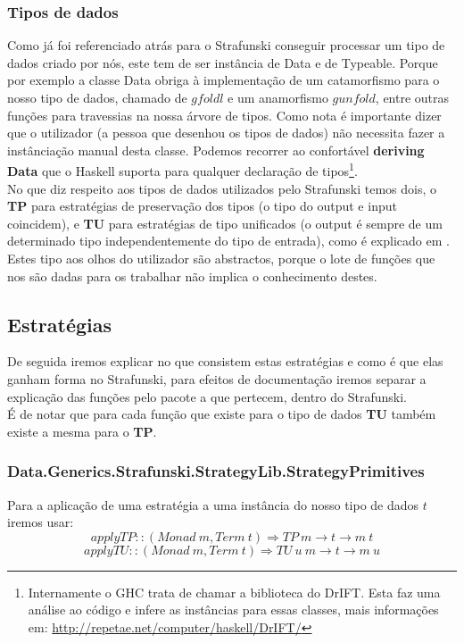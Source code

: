\subsubsection{Tipos de dados}
Como já foi referenciado atrás para o Strafunski conseguir processar um tipo de dados criado por nós, este tem de ser instância de Data e de Typeable.
Porque por exemplo a classe Data obriga à implementação de um catamorfismo para o nosso tipo de dados, chamado de $gfoldl$ e um anamorfismo $gunfold$, entre outras
funções para travessias na nossa árvore de tipos. Como nota é importante dizer que o utilizador (a pessoa que desenhou os tipos de dados) não necessita
fazer a instânciação manual desta classe. Podemos recorrer ao confortável \textbf{deriving Data} que o Haskell suporta para qualquer declaração
de tipos\footnote{Internamente o GHC trata de chamar a biblioteca do DrIFT. Esta faz uma análise ao código e infere as instâncias para essas classes, mais informações em: \url{http://repetae.net/computer/haskell/DrIFT/}}.\\

No que diz respeito aos tipos de dados utilizados pelo Strafunski temos dois, o \textbf{TP} para estratégias de preservação dos tipos
(o tipo do output e input coincidem), e \textbf{TU} para estratégias de tipo unificados (o output é sempre de um determinado tipo independentemente do tipo de entrada),
como é explicado em \cite{Lammel:2002:DPF:570186.570187}.\\
Estes tipo aos olhos do utilizador são abstractos, porque o lote de funções que nos são dadas para os trabalhar não implica o conhecimento destes.

\subsection{Estratégias}
De seguida iremos explicar no que consistem estas estratégias e como é que elas ganham forma no Strafunski, para efeitos de documentação iremos separar a explicação
das funções pelo pacote a que pertecem, dentro do Strafunski.\\
É de notar que para cada função que existe para o tipo de dados \textbf{TU} também existe a mesma para o \textbf{TP}.

\subsubsection{Data.Generics.Strafunski.StrategyLib.StrategyPrimitives}

Para a aplicação de uma estratégia a uma instância do nosso tipo de dados $t$ iremos usar:
$$applyTP :: (Monad~m, Term~t) \Rightarrow TP~m \rightarrow t \rightarrow m~t$$
$$applyTU :: (Monad~m, Term~t) \Rightarrow TU~u~m \rightarrow t \rightarrow m~u$$

